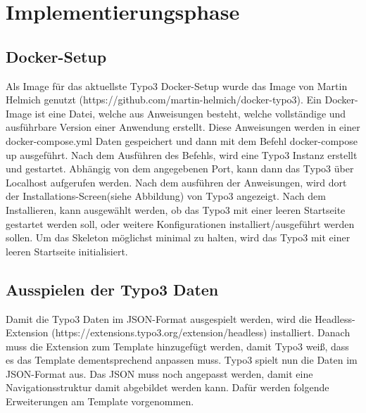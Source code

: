 \section{Implementierungsphase} 
\label{sec:Implementierungsphase}

\subsection{Docker-Setup}
\label{sec:Docker-Setup}

Als Image für das aktuellste Typo3 Docker-Setup wurde das Image von Martin Helmich genutzt (https://github.com/martin-helmich/docker-typo3). Ein Docker-Image ist eine Datei, welche aus Anweisungen besteht, welche vollständige und ausführbare Version einer Anwendung erstellt. Diese Anweisungen werden in einer docker-compose.yml Daten gespeichert und dann mit dem Befehl docker-compose up ausgeführt. Nach dem Ausführen des Befehls, wird eine Typo3 Instanz erstellt und gestartet. Abhängig von dem angegebenen Port, kann dann das Typo3 über Localhost aufgerufen werden. Nach dem ausführen der Anweisungen, wird dort der Installations-Screen(siehe Abbildung) von Typo3 angezeigt. Nach dem Installieren, kann ausgewählt werden, ob das Typo3 mit einer leeren Startseite gestartet werden soll, oder weitere Konfigurationen installiert/ausgeführt werden sollen. Um das Skeleton möglichst minimal zu halten, wird das Typo3 mit einer leeren Startseite initialisiert.

\subsection{Ausspielen der Typo3 Daten}
\label{sec:Ausspielen der Typo3 Daten}

Damit die Typo3 Daten im JSON-Format ausgespielt werden, wird die Headless-Extension \linebreak (https://extensions.typo3.org/extension/headless) installiert. Danach muss die Extension zum Template hinzugefügt werden, damit Typo3 weiß, dass es das Template dementsprechend anpassen muss. Typo3 spielt nun die Daten im JSON-Format aus. Das JSON muss noch angepasst werden, damit eine Navigationsstruktur damit abgebildet werden kann. Dafür werden folgende Erweiterungen am Template vorgenommen.

